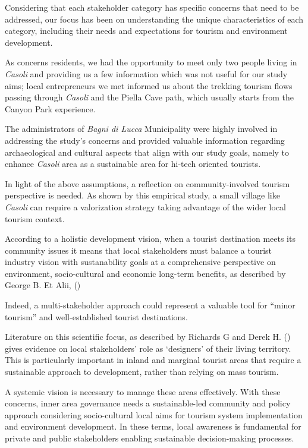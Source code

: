 \documentclass[sustainability,article,submit,pdftex,moreauthors]{Definitions/mdpi}
\begin{document}
Considering that each stakeholder category has specific concerns that need to be addressed, our focus has been on understanding the unique characteristics of each category, including their needs and expectations for tourism and environment development. 

As concerns residents, we had the opportunity to meet only two people living in \emph{Casoli}  and providing us a few information which was not useful for our study aims; local entrepreneurs we met informed us about the trekking tourism flows passing through \emph{Casoli}  and the Piella Cave path, which usually starts from the Canyon Park experience.

The administrators of \emph{Bagni di Lucca} Municipality were highly involved in addressing the study's concerns and provided valuable information regarding archaeological and cultural aspects that align with our study goals, namely to enhance \emph{Casoli}  area as a sustainable area for hi-tech oriented tourists. 

In light of the above assumptions, a reflection on community-involved tourism perspective is needed. As shown by this empirical study, a small village like \emph{Casoli}  can require a valorization strategy taking advantage of the wider local tourism context. 

According to a holistic development vision, when a tourist destination meets its community issues it means that local stakeholders must balance a tourist industry vision with sustanability goals at a comprehensive perspective on environment, socio-cultural and economic long-term benefits, as described by George B. Et Alii, () 

Indeed,  a multi-stakeholder approach could represent a valuable tool for “minor tourism” and well-established tourist destinations. 

Literature on this scientific focus, as described by Richards G and Derek H. () gives evidence on local stakeholders' role as ‘designers’ of their living territory. 
This is particularly important in inland and marginal tourist areas that require a sustainable approach to development, rather than relying on mass tourism. 

A systemic vision is necessary to manage these areas effectively. With these concerns, inner area governance needs a sustainable-led community and policy approach considering socio-cultural local aims for tourism system implementation and environment development. 
In these terms, local awareness is fundamental for private and public stakeholders enabling sustainable decision-making processes. 
\end{document}
